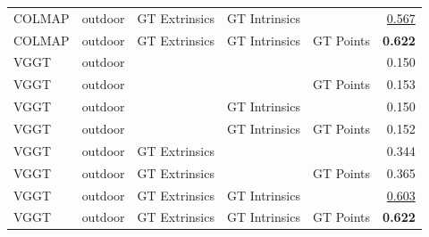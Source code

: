 \begin{table}[H]
\begin{tabular}{lllllr}
COLMAP & outdoor & GT Extrinsics & GT Intrinsics &  & \underline{0.567} \\
COLMAP & outdoor & GT Extrinsics & GT Intrinsics & GT Points & \textbf{0.622} \\
\midrule
VGGT & outdoor &  &  &  & 0.150 \\
VGGT & outdoor &  &  & GT Points & 0.153 \\
VGGT & outdoor &  & GT Intrinsics &  & 0.150 \\
VGGT & outdoor &  & GT Intrinsics & GT Points & 0.152 \\
VGGT & outdoor & GT Extrinsics &  &  & 0.344 \\
VGGT & outdoor & GT Extrinsics &  & GT Points & 0.365 \\
VGGT & outdoor & GT Extrinsics & GT Intrinsics &  & \underline{0.603} \\
VGGT & outdoor & GT Extrinsics & GT Intrinsics & GT Points & \textbf{0.622} \\
\bottomrule
\end{tabular}
\end{table}